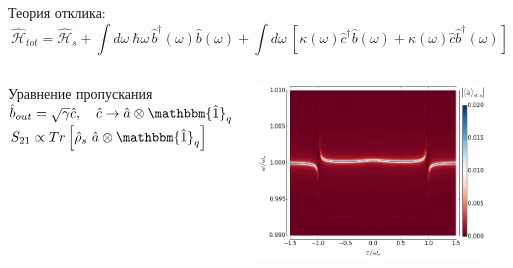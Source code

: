 \documentclass[aspectratio=169, 13pt]{beamer}
\begin{document}
\begin{frame}[c]\frametitle{\secname}\framesubtitle{\subsecname}
Теория отклика:
\centering
\begin{equation*}
\mathcal{\hat H}_{tot} = \mathcal{\hat H}_{s} +\int d\omega\ \hbar \omega\, \hat b^\dag(\omega) \hat b(\omega) + \int d\omega\ [ \kappa(\omega) \hat c^{\dag} \hat b(\omega) + \kappa(\omega)\hat c \hat b^{\dag}(\omega)]
\end{equation*}

\begin{columns}[c]
\begin{block}{Уравнение пропускания}
\centering
$\hat b_{out}= \sqrt{\gamma} \hat c,\quad \hat c \rightarrow \hat a \otimes \mathbbm{\hat 1}_q$\\

\vspace{.5cm}
$S_{21} \propto Tr\left[\hat \rho_s\ \hat a \otimes \mathbbm{\hat 1}_q\right]$
\end{block}
\includegraphics[width=0.9\textwidth]{Rabi_anticrossing_far_dyn}
\end{columns}
\end{frame}
\end{document}
